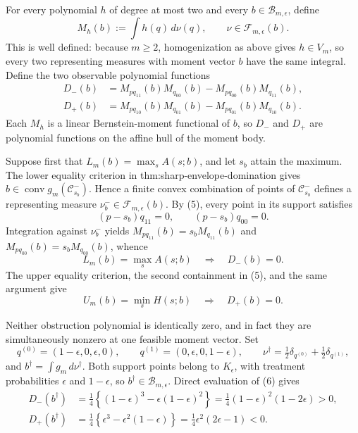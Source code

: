 For every polynomial \(h\) of degree at most two and every
\(b\in\mathcal B_{m,\epsilon}\), define
\[
 M_h(b):=\int h(q)\,d\nu(q),\qquad \nu\in\mathcal F_{m,\epsilon}(b).
\]
This is well defined: because \(m\geq2\), homogenization as above gives
\(h\in V_m\), so every two representing measures with moment vector \(b\)
have the same integral. Define the two observable polynomial functions
\[
 \begin{aligned}
 D_-(b)&=M_{p q_{11}}(b)M_{q_{00}}(b)
          -M_{p q_{00}}(b)M_{q_{11}}(b),\\
 D_+(b)&=M_{p q_{10}}(b)M_{q_{01}}(b)
          -M_{p q_{01}}(b)M_{q_{10}}(b).
 \end{aligned}                                                       \tag{6}
\]
Each \(M_h\) is a linear Bernstein-moment functional of \(b\), so
\(D_-\) and \(D_+\) are polynomial functions on the affine hull of the moment
body.

Suppose first that
\(L_m(b)=\max_s A(s;b)\), and let \(s_b\) attain the maximum. The lower equality
criterion in thm:sharp-envelope-domination gives
\(b\in\operatorname{conv}g_m(\mathcal C_{s_b}^-)\). Hence a finite convex
combination of points of \(\mathcal C_{s_b}^-\) defines a representing measure
\(\nu_b^-\in\mathcal F_{m,\epsilon}(b)\). By (5), every point in its support
satisfies
\[
 (p-s_b)q_{11}=0,
 \qquad
 (p-s_b)q_{00}=0.
\]
Integration against \(\nu_b^-\) yields
\(M_{p q_{11}}(b)=s_bM_{q_{11}}(b)\) and
\(M_{p q_{00}}(b)=s_bM_{q_{00}}(b)\), whence
\[
 L_m(b)=\max_s A(s;b)\quad\Longrightarrow\quad D_-(b)=0.             \tag{7}
\]
The upper equality criterion, the second containment in (5), and the same
argument give
\[
 U_m(b)=\min_s H(s;b)\quad\Longrightarrow\quad D_+(b)=0.             \tag{8}
\]

Neither obstruction polynomial is identically zero, and in fact they are
simultaneously nonzero at one feasible moment vector. Set
\[
 q^{(0)}=(1-\epsilon,0,\epsilon,0),
 \qquad
 q^{(1)}=(0,\epsilon,0,1-\epsilon),
 \qquad
 \nu^\dagger=\tfrac12\delta_{q^{(0)}}+\tfrac12\delta_{q^{(1)}},
\]
and \(b^\dagger=\int g_m\,d\nu^\dagger\). Both support points belong to
\(K_{\epsilon}\), with treatment probabilities \(\epsilon\) and
\(1-\epsilon\), so \(b^\dagger\in\mathcal B_{m,\epsilon}\). Direct evaluation
of (6) gives
\[
 \begin{aligned}
 D_-(b^\dagger)
 &=\frac14\left\{(1-\epsilon)^3-\epsilon(1-\epsilon)^2\right\}
   =\frac14(1-\epsilon)^2(1-2\epsilon)>0,\\
 D_+(b^\dagger)
 &=\frac14\left\{\epsilon^3-\epsilon^2(1-\epsilon)\right\}
   =\frac14\epsilon^2(2\epsilon-1)<0.                                \tag{9}
 \end{aligned}
\]


